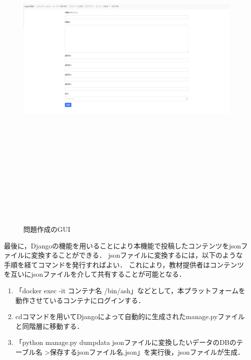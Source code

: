 \begin{figure}[htbp]
    \begin{center}
        \includegraphics[width=18cm,height=17cm,keepaspectratio]{create_question-crop.pdf}\\
    \end{center}
    \caption{問題作成のGUI}
    \label{create_question}
\end{figure}

最後に，Djangoの機能を用いることにより本機能で投稿したコンテンツをjsonファイルに変換することができる．
jsonファイルに変換するには，以下のような手順を経てコマンドを発行すればよい．
これにより，教材提供者はコンテンツを互いにjsonファイルを介して共有することが可能となる．

\begin{enumerate}
    \item 「docker exec -it コンテナ名 /bin/ash」などとして，本プラットフォームを動作させているコンテナにログインする．
    \item cdコマンドを用いてDjangoによって自動的に生成されたmanage.pyファイルと同階層に移動する．
    \item 「python manage.py dumpdata jsonファイルに変換したいデータのDBのテーブル名 \textgreater 保存するjsonファイル名.json」を実行後，jsonファイルが生成．
\end{enumerate}